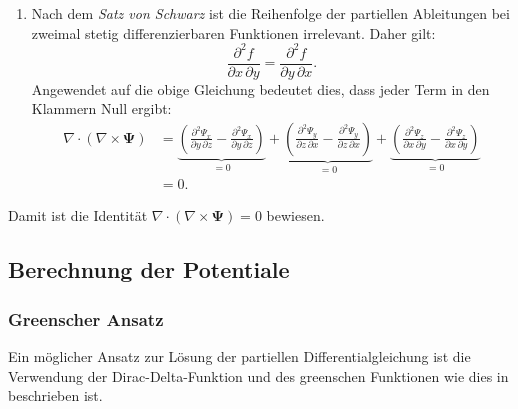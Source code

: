 \begin{enumerate}
    \item Nach dem \emph{Satz von Schwarz} ist die Reihenfolge der
    partiellen Ableitungen bei zweimal stetig differenzierbaren
    Funktionen irrelevant.
    Daher gilt:
    \[
    \frac{\partial^2 f}{\partial x\, \partial y} = \frac{\partial^2 f}{\partial y\, \partial x}.
    \]
    Angewendet auf die obige Gleichung bedeutet dies, dass jeder
    Term in den Klammern Null ergibt:
    \begin{align*}
    \nabla \cdot (\nabla \times \boldsymbol{\Psi})
&=
\underbrace{\left( \frac{\partial^2 \Psi_x}{\partial y\, \partial z} - \frac{\partial^2 \Psi_x}{\partial y\, \partial z} \right)}_{\displaystyle=0}
+
\underbrace{\left( \frac{\partial^2 \Psi_y}{\partial z\, \partial x} - \frac{\partial^2 \Psi_y}{\partial z\, \partial x} \right)}_{\displaystyle=0}
+
\underbrace{\left( \frac{\partial^2 \Psi_z}{\partial x\, \partial y} - \frac{\partial^2 \Psi_z}{\partial x\, \partial y} \right)}_{\displaystyle=0} \\
    &= 0.
    \end{align*}
\end{enumerate}
Damit ist die Identität $\nabla \cdot (\nabla \times \boldsymbol{\Psi})
= 0$ bewiesen.


\subsection{Berechnung der Potentiale
\label{helmholtz:subsection:Berechnung der Potentiale}}

\subsubsection{Greenscher Ansatz}
Ein möglicher Ansatz zur Lösung der partiellen Differentialgleichung
ist die Verwendung der Dirac-Delta-Funktion und des greenschen
Funktionen wie dies in \cite{baird_helmholtz} beschrieben ist.

